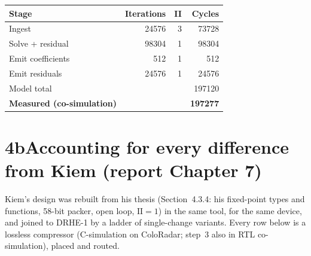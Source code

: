 \documentclass[10pt,a4paper]{article}
\newcommand{\tno}[1]{\textbf{#1}}
\begin{document}
\begin{center}
\begin{minipage}{0.98\textwidth}\centering
{}
\centering\small
\begin{tabular}{@{}lrrr@{}}
\toprule
Stage & Iterations & II & Cycles\\
\midrule
Ingest            & \num{24576} & 3 & \num{73728}\\
Solve + residual  & \num{98304} & 1 & \num{98304}\\
Emit coefficients & \num{512}   & 1 & \num{512}\\
Emit residuals    & \num{24576} & 1 & \num{24576}\\
\midrule
Model total       & & & \num{197120}\\
\tno{Measured (co-simulation)} & & & \tno{\num{197277}}\\
\bottomrule
\end{tabular}
\end{minipage}
\end{center}

\section{4b\quad Accounting for every difference from Kiem (report Chapter 7)}

\noindent\small
Kiem's design was rebuilt from his thesis (Section~4.3.4: his fixed-point types
and functions, 58-bit packer, open loop, $\mathrm{II} = 1$) in the same tool,
for the same device, and joined to DRHE-1 by a ladder of single-change
variants. Every row below is a lossless compressor (C-simulation on ColoRadar;
step~3 also in RTL co-simulation), placed and routed.
\normalsize



\end{document}
